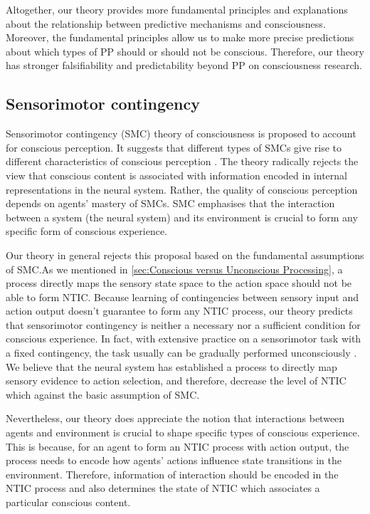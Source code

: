 \documentclass[utf8]{article}
\begin{document}
            Altogether, our theory provides more fundamental principles and explanations about the relationship between predictive mechanisms and consciousness. Moreover, the fundamental principles allow us to make more precise predictions about which types of PP should or should not be conscious. Therefore, our theory has stronger falsifiability and predictability beyond PP on consciousness research.
        



		\subsection{Sensorimotor contingency}
    		Sensorimotor contingency (SMC) theory of consciousness is proposed to account for conscious perception. It suggests that different types of SMCs give rise to different characteristics of conscious perception \cite{o2001sensorimotor}. The theory radically rejects the view that conscious content is associated with information encoded in internal representations in the neural system. Rather, the quality of conscious perception depends on agents' mastery of SMCs. SMC emphasises that the interaction between a system (the neural system) and its environment is crucial to form any specific form of conscious experience. 
    	
    	    Our theory in general rejects this proposal based on the fundamental assumptions of SMC.As we mentioned in \ref{sec:Conscious versus Unconscious Processing}, a process directly maps the sensory state space to the action space should not be able to form NTIC. Because learning of contingencies between sensory input and action output doesn't guarantee to form any NTIC process, our theory predicts that sensorimotor contingency is neither a necessary nor a sufficient condition for conscious experience. In fact, with extensive practice on a sensorimotor task with a fixed contingency, the task usually can be gradually performed unconsciously \needref{}. We believe that the neural system has established a process to directly map sensory evidence to action selection, and therefore, decrease the level of NTIC which against the basic assumption of SMC.
    	    
    	    Nevertheless, our theory does appreciate the notion that interactions between agents and environment is crucial to shape specific types of conscious experience. This is because, for an agent to form an NTIC process with action output, the process needs to encode how agents' actions influence state transitions in the environment. Therefore, information of interaction should be encoded in the NTIC process and also determines the state of NTIC which associates a particular conscious content. 
    	    
\end{document}
